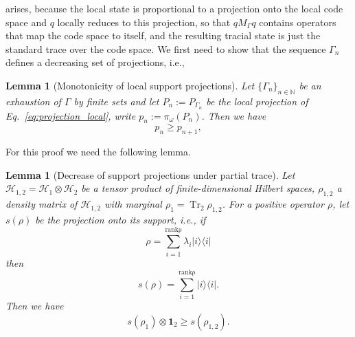 \documentclass[aps,pra,reprint,superscriptaddress]{revtex4-2}
\newcommand{\cH}{{\mathcal H}}
\newcommand\G{\Gamma}
\renewcommand\l{\lambda}
\renewcommand\r{\rho}
\newcommand\w{\omega}
\newcommand{\id}{\mathbf 1}
\providecommand{\ket}[1]{\lvert #1\rangle}
\providecommand{\bra}[1]{\langle #1\rvert}
\providecommand{\Tr}{\operatorname{Tr}}
\newtheorem{lemma}[theorem]{Lemma}
\theoremstyle{definition}
\theoremstyle{remark}
\begin{document}
arises, because the local state is proportional to a projection onto the local
code space and $q$ locally reduces to this projection, so that $q M_\G q$ contains operators 
that map the code space to itself, and the resulting tracial state is just the standard
trace over the code space.
We first need to show that the sequence $\G_n$ defines a decreasing set of
projections, i.e.,
\begin{lemma}[Monotonicity of local support projections]\label{lema:proj_inequality}
    Let $\{\G_n \}_{n \in \mathbb{N}}$ be an exhaustion of $\G$ by finite sets
    and let $P_n:=P_{\G_n}$ be the local projection of
    Eq.~\eqref{eq:projection_local}, write
    $p_n:=\pi_\w(P_n)$. Then we have
    \begin{equation}
    p_{n} \geq p_{n+1},
\end{equation}
\end{lemma}
For this proof we need the following lemma.
\begin{lemma}[Decrease of support projections under partial trace]
    Let $\cH_{1,2} = \cH_1 \otimes \cH_2$ be a tensor product of finite-dimensional
    Hilbert spaces, $\r_{1,2}$ a density matrix of $\cH_{1,2}$ with marginal
    $\r_1 = \Tr_{2} \r_{1,2}$. For a positive operator $\r$, let $s(\r)$ be the projection onto its support, i.e., if 
    \begin{equation}
        \r = \sum_{i = 1}^{\mathrm{rank \r}} \l_i \ket{i}\bra{i}
    \end{equation}
    then
    \begin{equation}
        s(\r) = \sum_{i = 1}^{\mathrm{rank \r}} \ket{i}\bra{i}.
    \end{equation}
    Then we have 
    \begin{equation}
        s(\r_1) \otimes \id_2 \geq s(\r_{1,2}).
    \end{equation}
\end{lemma}
\end{document}
